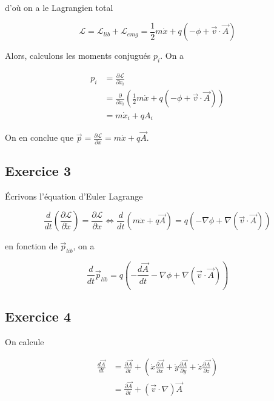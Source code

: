 \documentclass[french]{article}
\begin{document}
	d'où on a le Lagrangien total
	
	\begin{equation}
		\mathcal{L} = \mathcal{L}_{lib} +\mathcal{L}_{emg}  = \frac{1}{2} m \dot{x} + q \left(-\phi + \vec{v} \cdot \vec{A} \right)
	\end{equation}
	
	Alors, calculons les moments conjugués $p_i$. On a
	
	\begin{align}
		p_i &= \frac{\partial \mathcal{L}}{\partial \dot{x}_i} \\
		&= \frac{\partial}{\partial \dot{x}_i} \left( \frac{1}{2} m \dot{x} + q \left(-\phi + \vec{v} \cdot \vec{A} \right) \right) \\
		&= m \dot{x}_i + q A_i
	\end{align}
	
	On en conclue que $\vec{p} = \frac{\partial \mathcal{L}}{\partial \dot{x}} = m \dot{x} + q \vec{A}$.
	
	\subsection*{Exercice 3}
	
	Écrivons l'équation d'Euler Lagrange
	
	\begin{equation}
		\frac{d}{d t} \left(\frac{\partial \mathcal{L}}{\partial \dot{x}}\right) = \frac{\partial \mathcal{L}}{\partial x} \iff \frac{d}{dt} \left( m\dot{x} + q \vec{A} \right) = q \left( - \nabla \phi + \nabla (\vec{v} \cdot \vec{A}) \right)
	\end{equation}
	
	en fonction de $\vec{p}_{lib}$, on a
	
	\begin{equation}
		\frac{d}{dt} \vec{p}_{lib} = q \left( -\frac{d\vec{A}}{dt} - \nabla \phi + \nabla (\vec{v} \cdot \vec{A}) \right)
	\end{equation}
	
	\subsection*{Exercice 4}
	
	On calcule
	
	\begin{align}
		\frac{d \vec{A}}{dt}  &= \frac{\partial \vec{A}}{\partial t} + \left(\dot{x}\frac{\partial \vec{A}}{\partial x} + \dot{y}\frac{\partial \vec{A}}{\partial y} + \dot{z}\frac{\partial \vec{A}}{\partial z} \right)\\
		&= \frac{\partial \vec{A}}{\partial t} + (\vec{v} \cdot \nabla) \vec{A}
	\end{align}
	
\end{document}
